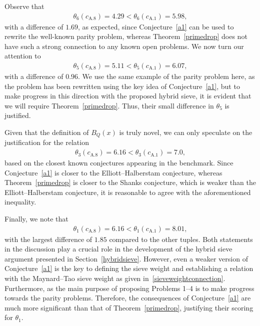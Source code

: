 \documentclass[11pt,reqno]{amsart}
\theoremstyle{plain}\newtheorem{theorem}{Theorem}[section]
\numberwithin{equation}{section}
\begin{document}
\medskip
\noindent
Observe that
\begin{align*}
\theta_6(c_{\mathrm{A.8}})=4.29<\theta_6(c_{\mathrm{A.1}})=5.98,
\end{align*}
with a difference of $1.69$, as expected, since Conjecture~\ref{a1} can be used to rewrite the well-known parity problem, whereas Theorem~\ref{primedrop} does not have such a strong connection to any known open problems. We now turn our attention to
\begin{align*}
\theta_5(c_{\mathrm{A.8}})=5.11<\theta_5(c_{\mathrm{A.1}})=6.07,
\end{align*}
with a difference of $0.96$. We use the same example of the parity problem here, as the problem has been rewritten using the key idea of Conjecture~\ref{a1}, but to make progress in this direction with the proposed hybrid sieve, it is evident that we will require Theorem~\ref{primedrop}. Thus, their small difference in $\theta_5$ is justified.

Given that the definition of $B_Q(x)$ is truly novel, we can only speculate on the justification for the relation
\begin{align*}
\theta_3(c_{\mathrm{A.8}})=6.16<\theta_3(c_{\mathrm{A.1}})=7.0,
\end{align*}
based on the closest known conjectures appearing in the benchmark. Since Conjecture~\ref{a1} is closer to the Elliott–Halberstam conjecture, whereas Theorem~\ref{primedrop} is closer to the Shanks conjecture, which is weaker than the Elliott–Halberstam conjecture, it is reasonable to agree with the aforementioned inequality.

\medskip
\noindent
Finally, we note that
\begin{align*}
\theta_1(c_{\mathrm{A.8}})=6.16<\theta_1(c_{\mathrm{A.1}})=8.01,
\end{align*}
with the largest difference of $1.85$ compared to the other tuples. Both statements in the discussion play a crucial role in the development of the hybrid sieve argument presented in Section~\ref{hybridsieve}. However, even a weaker version of Conjecture~\ref{a1} is the key to defining the sieve weight and establishing a relation with the Maynard–Tao sieve weight as given in~\eqref{sieveweightconnection}. Furthermore, as the main purpose of proposing Problems 1–4 is to make progress towards the parity problems. Therefore, the consequences of Conjecture~\ref{a1} are much more significant than that of Theorem~\ref{primedrop}, justifying their scoring for $\theta_1$.


\printbibliography
\end{document}
